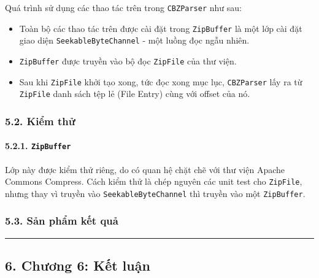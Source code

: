\documentclass[
]{article}
\providecommand{\tightlist}{%
  \setlength{\itemsep}{0pt}\setlength{\parskip}{0pt}}
\begin{document}
Quá trình sử dụng các thao tác trên trong \texttt{CBZParser} như sau:

\begin{itemize}
\tightlist
\item
  Toàn bộ các thao tác trên được cài đặt trong \texttt{ZipBuffer} là một
  lớp cài đặt giao diện \texttt{SeekableByteChannel} - một luồng đọc
  ngẫu nhiên.
\item
  \texttt{ZipBuffer} được truyền vào bộ đọc \texttt{ZipFile} của thư
  viện.
\item
  Sau khi \texttt{ZipFile} khởi tạo xong, tức đọc xong mục lục,
  \texttt{CBZParser} lấy ra từ \texttt{ZipFile} danh sách tệp lẻ (File
  Entry) cùng với offset của nó.
\end{itemize}

\hypertarget{kiux1ec3m-thux1eed}{%
\subsubsection{\texorpdfstring{5.2. Kiểm thử
}{5.2. Kiểm thử }}\label{kiux1ec3m-thux1eed}}

\hypertarget{zipbuffer}{%
\paragraph{\texorpdfstring{5.2.1.
\texttt{ZipBuffer}}{5.2.1. ZipBuffer}}\label{zipbuffer}}

Lớp này được kiểm thử riêng, do có quan hệ chặt chẽ với thư viện Apache
Commons Compress. Cách kiểm thử là chép nguyên các unit test cho
\texttt{ZipFile}, nhưng thay vì truyền vào \texttt{SeekableByteChannel}
thì truyền vào một \texttt{ZipBuffer}.

\hypertarget{sux1ea3n-phux1ea9m-kux1ebft-quux1ea3}{%
\subsubsection{\texorpdfstring{5.3. Sản phẩm kết quả
}{5.3. Sản phẩm kết quả }}\label{sux1ea3n-phux1ea9m-kux1ebft-quux1ea3}}

\begin{center}\rule{0.5\linewidth}{0.5pt}\end{center}

\hypertarget{chux1b0ux1a1ng-6-kux1ebft-luux1eadn}{%
\subsection{\texorpdfstring{6. Chương 6: Kết luận
}{6. Chương 6: Kết luận }}\label{chux1b0ux1a1ng-6-kux1ebft-luux1eadn}}
\end{document}
